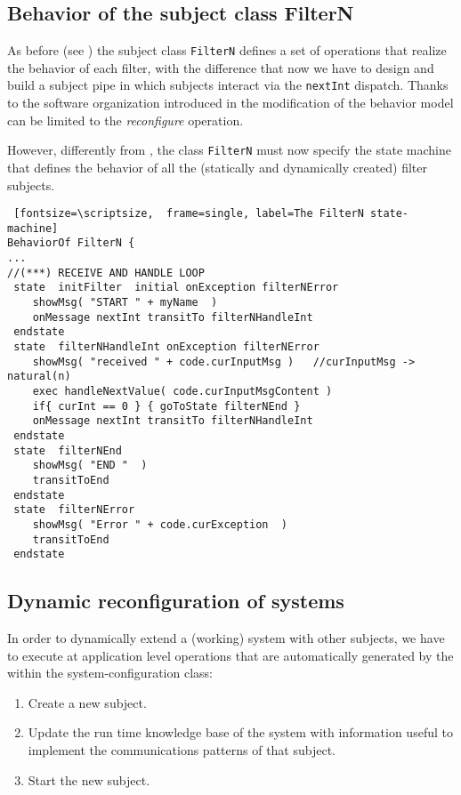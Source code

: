 \documentclass{../llncs}
\begin{document}
\subsection{Behavior of the subject class FilterN}
As before (see ) the subject class \texttt{FilterN} defines a set of operations that realize the behavior of each filter, with the difference that now we have to design and build a subject pipe in which subjects interact via the \texttt{nextInt} dispatch.
%
Thanks to the software organization introduced in  the modification of the behavior model can be limited to the \textit{reconfigure} operation.

However, differently from , the class \texttt{FilterN} must now specify the state machine that defines the behavior of all the (statically and dynamically created) filter subjects.

\begin{Verbatim} [fontsize=\scriptsize,  frame=single, label=The FilterN state-machine] 
BehaviorOf FilterN {    
...    
//(***) RECEIVE AND HANDLE LOOP 
 state  initFilter  initial onException filterNError
	showMsg( "START " + myName	)
	onMessage nextInt transitTo filterNHandleInt   
 endstate 	 
 state  filterNHandleInt onException filterNError
	showMsg( "received " + code.curInputMsg )	//curInputMsg -> natural(n)
	exec handleNextValue( code.curInputMsgContent )    
	if{ curInt == 0 } { goToState filterNEnd }
	onMessage nextInt transitTo filterNHandleInt
 endstate 		
 state  filterNEnd
	showMsg( "END "  ) 
	transitToEnd
 endstate 	
 state  filterNError
	showMsg( "Error " + code.curException  ) 
	transitToEnd
 endstate    
\end{Verbatim}

\subsection{Dynamic reconfiguration of \contact{} systems }
In order to dynamically extend a (working)  \contact{} system with other subjects, we have to execute at application level operations that are automatically generated by the \ide{} within the system-configuration class:

\begin{enumerate}
\item Create a new subject.
\item Update the run time knowledge base of the system with information useful to implement the communications patterns of that subject.
\item Start the new subject.
\end{enumerate}
\end{document}
